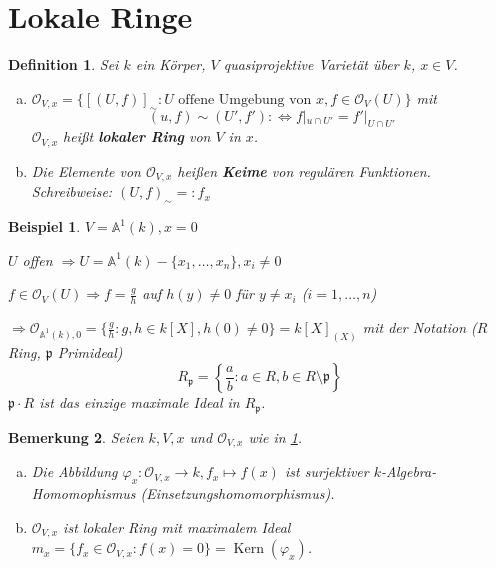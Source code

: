 \documentclass[a4paper, 12pt, numbers=noendperiod, chapterprefix=true, headsepline]{scrbook}
\theoremstyle{break}
\newtheorem{Def}{Definition}[section]
\newtheorem{Bem}[Def]{Bemerkung}
\theoremstyle{nonumberbreak}
\newtheorem{nnBsp}{Beispiel}
\theoremstyle{nonumberplain}
\newcommand{\quot}[1]{\textrm{\glqq}{#1}\textrm{\grqq}}
\newcommand{\emp}[1]{\textbf{\emph{#1}}}
\newcommand{\defterm}[1]{{\index{#1}}\emp{#1}}
\newcommand{\deftermspec}[2]{{\index{#2}}\emp{#1}}
\DeclareMathOperator{\Kern}{Kern}
\newcommand{\A}{\mathbb{A}}
\newcommand{\calO}{\mathcal{O}}
\begin{document}
\section{Lokale Ringe}

\begin{Def}\label{def15.1}
Sei $k$ ein K\"orper, $V$ quasiprojektive Variet\"at \"uber $k$, $x\in V$.
\begin{enumerate}[a)]
\item
	$\calO_{V,x}=\{[(U,f)]_{\sim}: U \text{ offene Umgebung von } x, f\in \calO_V(U)\}$ mit \[(u,f)\sim (U',f') :\Leftrightarrow f|_{u\cap U'}=f'|_{U\cap U'}\]
	$\calO_{V,x}$ hei\ss t \defterm{lokaler Ring} von $V$ in $x$.
\item
	Die Elemente von $\calO_{V,x}$ hei\ss en \deftermspec{Keime}{Keim} von regul\"aren Funktionen. \emph{Schreibweise}: $(U,f)_\sim=:f_x$
\end{enumerate}\end{Def}

\begin{nnBsp}
$V=\A^1(k), x=0$

$U$ offen $\Rightarrow U=\A^1(k)-\{x_1,\ldots ,x_n\}, x_i\ne 0$

$f\in \calO_V(U)\Rightarrow f=\frac{g}{h}$ auf $h(y)\ne 0$ f\"ur $y\ne x_i$ ($i=1,\ldots ,n$)

$\Rightarrow \calO_{\A^1(k),0} = \{\frac{g}{h}:g,h\in k[X], h(0)\ne 0\} = k[X]_{(X)}$ mit der Notation ($R$ Ring, $\mathfrak p$ Primideal)
	\[ R_{\mathfrak p} = \left\{ \frac{a}{b} : a\in R, b\in R\setminus \mathfrak p\right\} \]
$\mathfrak p\cdot R$ ist das einzige maximale Ideal in $R_{\mathfrak p}$.
\end{nnBsp}

\begin{Bem}
Seien $k,V,x$ und $\calO_{V,x}$ wie in \ref{def15.1}.
\begin{enumerate}[a)]
\item
	Die Abbildung $\varphi_x:\calO_{V,x}\to k, f_x\mapsto f(x)$ ist surjektiver $k$-Algebra-Homomophismus (\quot{Einsetzungshomomorphismus}).
\item
	$\calO_{V,x}$ ist lokaler Ring mit maximalem Ideal $m_x=\{f_x\in \calO_{V,x}:f(x)=0\}=\Kern(\varphi_x)$.
\end{enumerate}\end{Bem}
\end{document}

